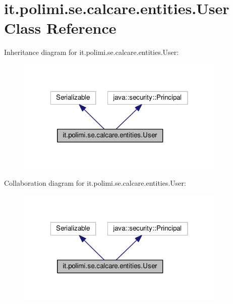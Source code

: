 \hypertarget{classit_1_1polimi_1_1se_1_1calcare_1_1entities_1_1User}{}\section{it.\+polimi.\+se.\+calcare.\+entities.\+User Class Reference}
\label{classit_1_1polimi_1_1se_1_1calcare_1_1entities_1_1User}


Inheritance diagram for it.\+polimi.\+se.\+calcare.\+entities.\+User\+:
\nopagebreak
\begin{figure}[H]
\begin{center}
\leavevmode
\includegraphics[width=283pt]{classit_1_1polimi_1_1se_1_1calcare_1_1entities_1_1User__inherit__graph}
\end{center}
\end{figure}


Collaboration diagram for it.\+polimi.\+se.\+calcare.\+entities.\+User\+:
\nopagebreak
\begin{figure}[H]
\begin{center}
\leavevmode
\includegraphics[width=283pt]{classit_1_1polimi_1_1se_1_1calcare_1_1entities_1_1User__coll__graph}
\end{center}
\end{figure}
